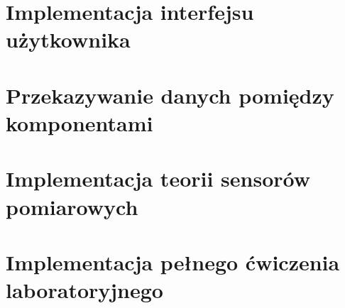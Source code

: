 \section{Implementacja interfejsu użytkownika}\label{sect:ui}


\section{Przekazywanie danych pomiędzy komponentami}\label{sect:context}


\section{Implementacja teorii sensorów pomiarowych}\label{sect:sensors-code}


\section{Implementacja pełnego ćwiczenia laboratoryjnego}\label{sect:laboratory}
